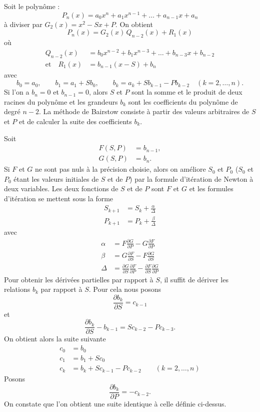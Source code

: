 Soit le polynôme :
\[
  P_n(x) = a_0x^n + a_1x^{n-1} + \dots + a_{n-1}x + a_n
\]
à diviser par $G_2(x) = x^2 - Sx + P$. On obtient
\[
  P_n(x) = G_2(x)\,Q_{n-2}(x) + R_1(x)
\]
où
\[
  \begin{aligned}
    Q_{n-2}(x) &= b_0x^{n-2} + b_1x^{n-3} + \dots + b_{n-3}x + b_{n-2}\\
    \text{et}\quad R_1(x) &= b_{n-1}(x - S) + b_n
  \end{aligned}
\]
avec
\[
  b_0 = a_0, \qquad b_1 = a_1 + Sb_0, \qquad
  b_k = a_k + Sb_{k-1} - Pb_{k-2} \quad (k = 2, \dots, n).
\]
Si l'on a $b_n = 0$ et $b_{n-1} = 0$, alors $S$ et $P$ sont la somme et le
produit de deux racines du polynôme et les grandeurs $b_k$ sont les
coefficients du polynôme de degré $n-2$. La méthode de Bairstow consiste à
partir des valeurs arbitraires de $S$ et $P$ et de calculer la suite des
coefficients $b_k$.

Soit
\[
  \begin{aligned}
    F(S,P) &= b_{n-1},\\
    G(S,P) &= b_n .
  \end{aligned}
\]
Si $F$ et $G$ ne sont pas nuls à la précision choisie, alors on améliore $S_0$
et $P_0$ ($S_0$ et $P_0$ étant les valeurs initiales de $S$ et de $P$) par la
formule d'itération de Newton à deux variables. Les deux fonctions de $S$ et
de $P$ sont $F$ et $G$ et les formules d'itération se mettent sous la forme
\[
  \begin{aligned}
    S_{k+1} &= S_k + \frac{\alpha}{\Delta}\\
    P_{k+1} &= P_k + \frac{\beta}{\Delta}
  \end{aligned}
\]
avec
\[
  \begin{aligned}
    \alpha &= F\frac{\partial G}{\partial P} - G\frac{\partial F}{\partial P}\\
    \beta &= G\frac{\partial F}{\partial S} - F\frac{\partial G}{\partial S}\\
    \Delta &= \frac{\partial G}{\partial S}\frac{\partial F}{\partial P}
            - \frac{\partial F}{\partial S}\frac{\partial G}{\partial P}
  \end{aligned}
\]
Pour obtenir les dérivées partielles par rapport à $S$, il suffit de dériver
les relations $b_k$ par rapport à $S$. Pour cela nous posons
\[
  \frac{\partial b_k}{\partial S} = c_{k-1}
\]
et
\[
  \frac{\partial b_k}{\partial S} - b_{k-1} = Sc_{k-2} - Pc_{k-3} .
\]
On obtient alors la suite suivante
\[
  \begin{aligned}
    c_0 &= b_0\\
    c_1 &= b_1 + Sc_0\\
    c_k &= b_k + Sc_{k-1} - Pc_{k-2} \qquad (k = 2, \dots, n)
  \end{aligned}
\]
Posons
\[
  \frac{\partial b_k}{\partial P} = -c_{k-2} .
\]
On constate que l'on obtient une suite identique à celle définie ci-dessus.


